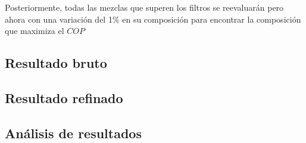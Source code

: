 \documentclass[../main.tex]{subfiles}
\begin{document}
Posteriormente, todas las mezclas que superen los filtros se reevaluarán pero ahora 
con una variación del 1\% en su composición para encontrar la composición que maximiza 
el $COP$

\subsection{Resultado bruto}

\subsection{Resultado refinado}

\subsection{Análisis de resultados}


\newpage
\end{document}
